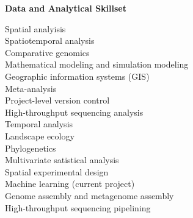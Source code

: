 \documentclass{article}
\begin{document}
{\large  \textbf{Data and Analytical Skillset}}
  \begin{adjustwidth}{2mm}{}\begin{multicols}{2}
    Spatial analyisis \cite{Darcy2018a,Darcy2011a,Darcy640029}\\
    Spatiotemporal analysis \cite{Darcy640029,Darcy2017,Nemergut2016}\\
    Comparative genomics \cite{Darcy2018,Lynch2014}\\
    Mathematical modeling and simulation modeling \cite{Darcy685644,Darcy640029, Darcy2016}\\
    Geographic information systems (GIS) \cite{Darcy640029,Darcy2018a,Darcy2017}\\
    Meta-analysis \cite{Darcy685644,Darcy2018a,Darcy2011a}\\
    Project-level version control \cite[\href{https://github.com/darcyj/specificity}{specificity} R package]{Darcy2018}\\
    High-throughput sequencing analysis \cite{Darcy685644,Darcy640029,Darcy2018a}\\

    Temporal analysis \cite{Darcy685644,Knelman2014,Kennedy2016}\\
    Landscape ecology \cite{Darcy640029,Darcy2018,Darcy2017}\\
    Phylogenetics \cite{Darcy2011a,Schmidt2015a,Naff2013}\\
    Multivariate satistical analysis \cite{Darcy640029,Darcy2017,Gendron2019}\\
    Spatial experimental design \cite{Darcy2018a,Darcy2017,Darcy2018}\\
    Machine learning (current project)\\
    Genome assembly and metagenome assembly \cite{Darcy2018,Lynch2014}\\
    High-throughput sequencing pipelining \cite{Darcy685644,Darcy640029,Darcy2018a}

  \end{multicols}\end{adjustwidth}
\end{document}
